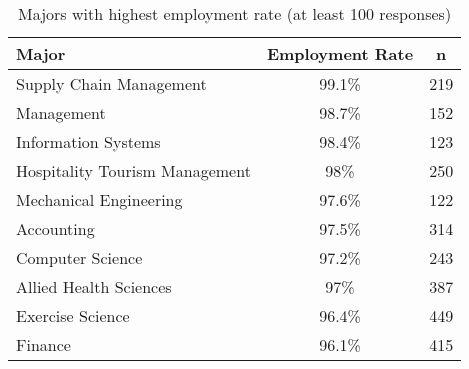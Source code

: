 \documentclass{article}
\begin{document}
\begin{table}[ht]
\centering
\begin{tabular}{lcc}
  \hline
  Major & Employment Rate & n \\ 
  \hline
  Supply Chain Management & 99.1\% & 219 \\ 
  Management & 98.7\% & 152 \\ 
  Information Systems & 98.4\% & 123 \\ 
  Hospitality Tourism Management & 98\% & 250 \\ 
  Mechanical Engineering & 97.6\% & 122 \\ 
  Accounting & 97.5\% & 314 \\ 
  Computer Science & 97.2\% & 243 \\ 
  Allied Health Sciences & 97\% & 387 \\ 
  Exercise Science & 96.4\% & 449 \\ 
  Finance & 96.1\% & 415 \\ 
   \hline
\end{tabular}
\caption*{Majors with highest employment rate (at least 100 responses)} 
\end{table}
\end{document}
